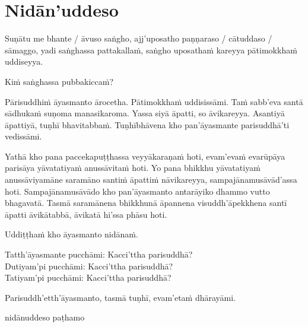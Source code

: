 \section{Nidān'uddeso}
\label{nidan'uddeso}

Suṇātu me bhante / āvuso saṅgho, ajj'uposatho paṇṇaraso / cātuddaso / sāmaggo, yadi saṅghassa pattakallaṁ, saṅgho uposathaṁ kareyya pātimokkhaṁ uddiseyya.

Kiṁ saṅghassa pubbakiccaṁ?

Pārisuddhiṁ āyasmanto ārocetha. Pātimokkhaṁ uddisissāmi. Taṁ sabb'eva santā sādhukaṁ suṇoma manasikaroma. Yassa siyā āpatti, so āvikareyya. Asantiyā āpattiyā, tuṇhī bhavitabbaṁ. Tuṇhībhāvena kho pan'āyasmante parisuddhā'ti vedissāmi.

Yathā kho pana paccekapuṭṭhassa veyyākaraṇaṁ hoti, evam'evaṁ evarūpāya parisāya yāvatatiyaṁ anussāvitaṁ hoti. Yo pana bhikkhu yāvatatiyaṁ anussāviyamāne saramāno santiṁ āpattiṁ nāvikareyya, sampajānamusāvād'assa hoti. Sampajānamusāvādo kho pan'āyasmanto antarāyiko dhammo vutto bhagavatā. Tasmā saramānena bhikkhunā āpannena visuddh'āpekkhena santī āpatti āvikātabbā, āvikatā hi'ssa phāsu hoti.

\medskip

\begin{center}
Uddiṭṭhaṁ kho āyasmanto nidānaṁ.\makeatletter\hyperlink{endnote8-appendix}\makeatother

\smallskip

Tatth'āyasmante pucchāmi: Kacci'ttha parisuddhā?\\
Dutiyam'pi pucchāmi: Kacci'ttha parisuddhā?\\
Tatiyam'pi pucchāmi: Kacci'ttha parisuddhā?

\smallskip

Parisuddh'etth'āyasmanto, tasmā tuṇhī, evam'etaṁ dhārayāmi.
\end{center}

\begin{outro}
  nidānuddeso paṭhamo\makeatletter\hyperlink{endnote9-appendix}\makeatother
\end{outro}

\clearpage
